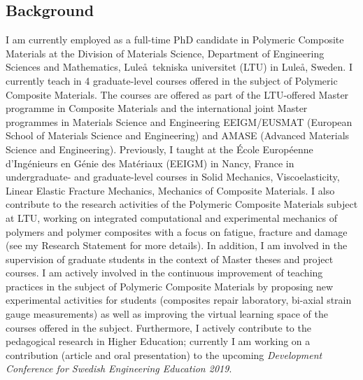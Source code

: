 \documentclass[
  a4paper, 
]{fortysecondscv}
\begin{document}
\makefrontsidebar

\subsection{Background}
I am currently employed as a full-time PhD candidate in Polymeric Composite Materials at the Division of Materials Science, Department of Engineering Sciences and Mathematics, Lule\aa\ tekniska universitet (LTU) in Lule\aa, Sweden. I currently teach in 4 graduate-level courses offered in the subject of Polymeric Composite Materials. The courses are offered as part of the LTU-offered Master programme in Composite Materials and the international joint Master programmes in Materials Science and Engineering EEIGM/EUSMAT (European School of Materials Science and Engineering) and AMASE (Advanced Materials Science and Engineering). Previously, I taught at the \'Ecole Europ\'eenne d'Ing\'enieurs en G\'enie des Mat\'eriaux (EEIGM) in Nancy, France in undergraduate- and graduate-level courses in Solid Mechanics, Viscoelasticity, Linear Elastic Fracture Mechanics, Mechanics of Composite Materials. I also contribute to the research activities of the Polymeric Composite Materials subject at LTU, working on integrated computational and experimental mechanics of polymers and polymer composites with a focus on fatigue, fracture and damage (see my Research Statement for more details). In addition, I am involved in the supervision of graduate students in the context of Master theses and project courses. I am actively involved in the continuous improvement of teaching practices in the subject of Polymeric Composite Materials by proposing new experimental activities for students (composites repair laboratory, bi-axial strain gauge measurements) as well as improving the virtual learning space of the courses offered in the subject. Furthermore, I actively contribute to the pedagogical research in Higher Education; currently I am working on a contribution (article and oral presentation) to the upcoming \textit{Development Conference for Swedish Engineering Education 2019}.
\end{document}
